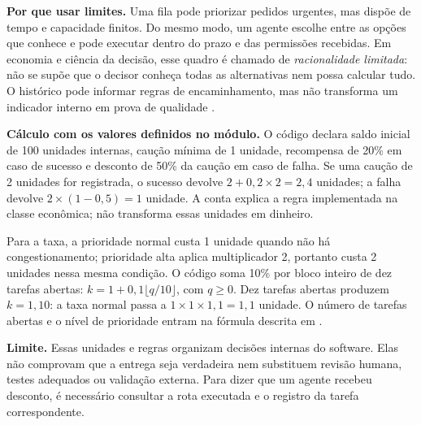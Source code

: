 \begin{descricao}
\textbf{Por que usar limites.} Uma fila pode priorizar pedidos urgentes, mas
dispõe de tempo e capacidade finitos. Do mesmo modo, um agente escolhe entre as
opções que conhece e pode executar dentro do prazo e das permissões recebidas.
Em economia e ciência da decisão, esse quadro é chamado de \emph{racionalidade
limitada}: não se supõe que o decisor conheça todas as alternativas nem possa
calcular tudo. O histórico pode informar regras de encaminhamento, mas não
transforma um indicador interno em prova de qualidade .
\end{descricao}

\begin{resultado}
\textbf{Cálculo com os valores definidos no módulo.} O código declara saldo
inicial de 100 unidades internas, caução mínima de 1 unidade, recompensa de
20\% em caso de sucesso e desconto de 50\% da caução em caso de falha. Se uma
caução de 2 unidades for registrada, o sucesso devolve $2+0{,}2\times2=2{,}4$
unidades; a falha devolve $2\times(1-0{,}5)=1$ unidade. A conta explica a regra
implementada na classe econômica; não transforma essas unidades em dinheiro.

Para a taxa, a prioridade normal custa 1 unidade quando não há congestionamento;
prioridade alta aplica multiplicador 2, portanto custa 2 unidades nessa mesma
condição. O código soma 10\% por bloco inteiro de dez tarefas abertas: $k=1+0{,}1\lfloor q/10\rfloor$, com $q\geq0$. Dez tarefas abertas produzem $k=1{,}10$: a taxa normal passa a
$1\times1\times1{,}1=1{,}1$ unidade. O número de tarefas abertas e o nível de
prioridade entram na fórmula descrita em .
\end{resultado}

\begin{aviso}
\textbf{Limite.} Essas unidades e regras organizam decisões internas do software.
Elas não comprovam que a entrega seja verdadeira nem substituem revisão humana,
testes adequados ou validação externa. Para dizer que um agente recebeu desconto,
é necessário consultar a rota executada e o registro da tarefa correspondente.
\end{aviso}

